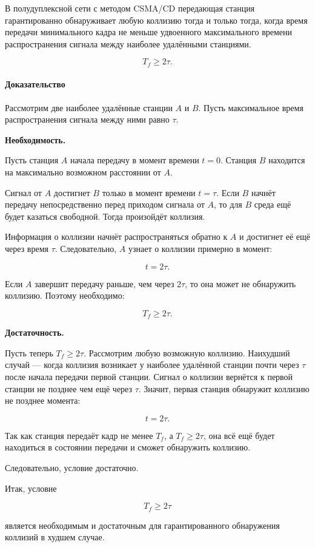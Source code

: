\documentclass[12pt,a4paper]{article}
\begin{document}
В полудуплексной сети с методом CSMA/CD передающая станция гарантированно обнаруживает любую коллизию тогда и только тогда, когда время передачи минимального кадра не меньше удвоенного максимального времени распространения сигнала между наиболее удалёнными станциями.

\[
T_f \geq 2\tau.
\]

\paragraph{Доказательство}

Рассмотрим две наиболее удалённые станции $A$ и $B$. Пусть максимальное время распространения сигнала между ними равно $\tau$.

\textbf{Необходимость.}

Пусть станция $A$ начала передачу в момент времени $t=0$. Станция $B$ находится на максимально возможном расстоянии от $A$.

Сигнал от $A$ достигнет $B$ только в момент времени $t=\tau$. Если $B$ начнёт передачу непосредственно перед приходом сигнала от $A$, то для $B$ среда ещё будет казаться свободной. Тогда произойдёт коллизия.

Информация о коллизии начнёт распространяться обратно к $A$ и достигнет её ещё через время $\tau$. Следовательно, $A$ узнает о коллизии примерно в момент:

\[
t = 2\tau.
\]

Если $A$ завершит передачу раньше, чем через $2\tau$, то она может не обнаружить коллизию. Поэтому необходимо:

\[
T_f \geq 2\tau.
\]

\textbf{Достаточность.}

Пусть теперь $T_f \geq 2\tau$. Рассмотрим любую возможную коллизию. Наихудший случай --- когда коллизия возникает у наиболее удалённой станции почти через $\tau$ после начала передачи первой станции. Сигнал о коллизии вернётся к первой станции не позднее чем ещё через $\tau$. Значит, первая станция обнаружит коллизию не позднее момента:

\[
t = 2\tau.
\]

Так как станция передаёт кадр не менее $T_f$, а $T_f \geq 2\tau$, она всё ещё будет находиться в состоянии передачи и сможет обнаружить коллизию.

Следовательно, условие достаточно.

Итак, условие

\[
T_f \geq 2\tau
\]

является необходимым и достаточным для гарантированного обнаружения коллизий в худшем случае.
\end{document}
